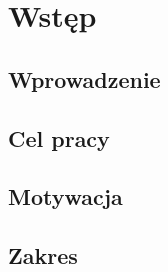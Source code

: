 \chapter{Wstęp}

\section{Wprowadzenie}

\section{Cel pracy}

\section{Motywacja}

\section{Zakres}
